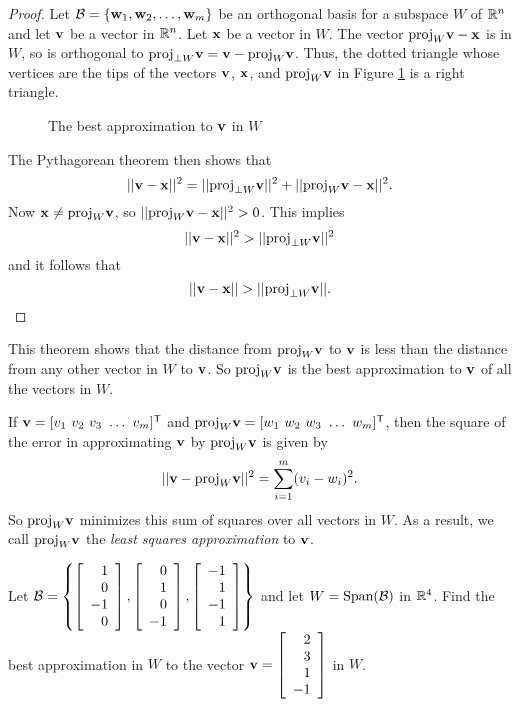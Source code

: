 \begin{proof} Let $\mathcal{B} = \{\mathbf{w}_1, \mathbf{w}_2, \ldots, \mathbf{w}_m\}$ be an orthogonal basis for a subspace $W$ of $\mathbb{R}^n$ and let $\mathbf{v}$ be a vector in $\mathbb{R}^n$. Let $\mathbf{x}$ be a vector in $W$. The vector $\text{proj}_W \mathbf{v} - \mathbf{x}$ is in $W$, so is orthogonal to $\text{proj}_{\perp W} \mathbf{v} = \mathbf{v} - \text{proj}_W \mathbf{v}$. Thus, the dotted triangle whose vertices are the tips of the vectors $\mathbf{v}$, $\mathbf{x}$, and $\text{proj}_W \mathbf{v}$ in Figure \ref{F:best_approx} is a right triangle.
\begin{figure}[h]
\begin{center}
\caption{The best approximation to $\mathbf{v}$ in $W$}
\label{F:best_approx}
\end{center}
\end{figure}
The Pythagorean theorem then shows that
\[|| \mathbf{v} - \mathbf{x} ||^2 = || \text{proj}_{\perp W} \mathbf{v} ||^2 + || \text{proj}_W \mathbf{v} - \mathbf{x} ||^2.\]
Now $\mathbf{x} \neq \text{proj}_W \mathbf{v}$, so $|| \text{proj}_W \mathbf{v} - \mathbf{x} ||^2 > 0$. This implies
\[|| \mathbf{v} - \mathbf{x} ||^2 > || \text{proj}_{\perp W} \mathbf{v} ||^2\]
and it follows that
\[|| \mathbf{v} - \mathbf{x} || > || \text{proj}_{\perp W} \mathbf{v} ||.\]
\end{proof}
This theorem shows that the distance from $\text{proj}_W \mathbf{v}$ to $\mathbf{v}$ is less than the distance from any other vector in $W$ to $\mathbf{v}$. So $\text{proj}_W \mathbf{v}$ is the best approximation to $\mathbf{v}$ of all the vectors in $W$.

If $\vv = [v_1 \ v_2 \ v_3 \ \ldots \ v_m]^{\tr}$ and $\proj_W \vv =  [w_1 \ w_2 \ w_3 \ \ldots \ w_m]^{\tr}$, then the square of the error in approximating $\mathbf{v}$ by $\text{proj}_W \mathbf{v}$ is given by
\[|| \mathbf{v} - \text{proj}_W \mathbf{v} ||^2 = \sum_{i=1}^m (v_i - w_i)^2.\]
So $\text{proj}_W \mathbf{v}$ minimizes this sum of squares over all vectors in $W$. As a result, we call $\text{proj}_W \mathbf{v}$ the \emph{least squares approximation} to $\mathbf{v}$.

\begin{activity} Let $\mathcal{B} = \left\{\left[ \begin{array}{r} 1 \\ 0 \\ -1 \\ 0 \end{array} \right], \left[ \begin{array}{r} 0 \\ 1 \\ 0 \\ -1 \end{array} \right], \left[ \begin{array}{r} -1 \\ 1 \\ -1 \\ 1 \end{array} \right]\right\}$ and let $W = \text{Span}(\mathcal{B})$ in $\mathbb{R}^4$. Find the best approximation in $W$ to the vector $\mathbf{v} = \left[ \begin{array}{r} 2 \\ 3 \\ 1 \\ -1 \end{array} \right]$ in $W$.
\end{activity}


